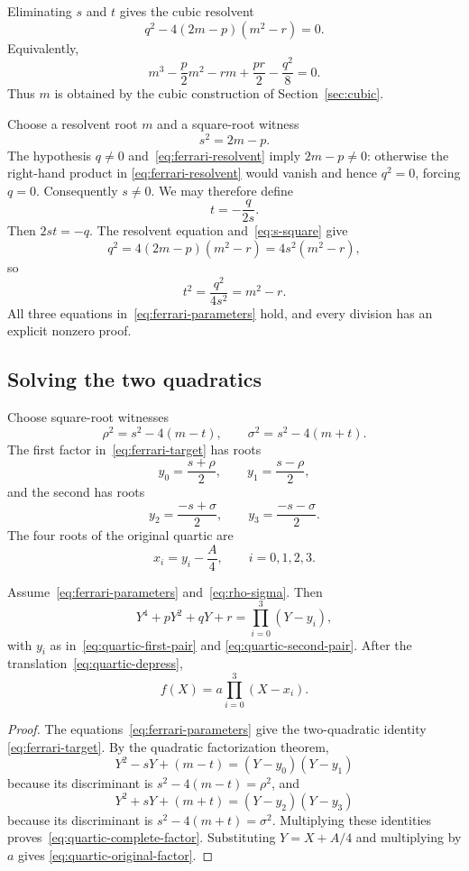 Eliminating $s$ and $t$ gives the cubic resolvent
\[
 q^2-4(2m-p)(m^2-r)=0.
 \tag{F5}\label{eq:ferrari-resolvent}
\]
Equivalently,
\[
 m^3-\frac p2m^2-rm+\frac{pr}{2}-\frac{q^2}{8}=0.
 \tag{F6}\label{eq:ferrari-resolvent-monic}
\]
Thus $m$ is obtained by the cubic construction of
Section~\ref{sec:cubic}.

Choose a resolvent root $m$ and a square-root witness
\[
 s^2=2m-p.
 \tag{F7}\label{eq:s-square}
\]
The hypothesis $q\ne0$ and~\eqref{eq:ferrari-resolvent} imply
$2m-p\ne0$: otherwise the right-hand product in
\eqref{eq:ferrari-resolvent} would vanish and hence $q^2=0$, forcing $q=0$.
Consequently $s\ne0$.  We may therefore define
\[
 t=-\frac{q}{2s}.
 \tag{F8}\label{eq:t-quotient}
\]
Then $2st=-q$.  The resolvent equation and~\eqref{eq:s-square} give
\[
 q^2=4(2m-p)(m^2-r)=4s^2(m^2-r),
\]
so
\[
 t^2=\frac{q^2}{4s^2}=m^2-r.
\]
All three equations in~\eqref{eq:ferrari-parameters} hold, and every division
has an explicit nonzero proof.

\subsection{Solving the two quadratics}

Choose square-root witnesses
\[
 \rho^2=s^2-4(m-t),
 \qquad
 \sigma^2=s^2-4(m+t).
 \tag{F9}\label{eq:rho-sigma}
\]
The first factor in~\eqref{eq:ferrari-target} has roots
\[
 y_0=\frac{s+\rho}{2},
 \qquad
 y_1=\frac{s-\rho}{2},
 \tag{F10}\label{eq:quartic-first-pair}
\]
and the second has roots
\[
 y_2=\frac{-s+\sigma}{2},
 \qquad
 y_3=\frac{-s-\sigma}{2}.
 \tag{F11}\label{eq:quartic-second-pair}
\]
The four roots of the original quartic are
\[
 x_i=y_i-\frac A4,
 \qquad i=0,1,2,3.
 \tag{F12}\label{eq:quartic-roots}
\]

\begin{theorem}
\label{thm:ferrari-factorization}
Assume~\eqref{eq:ferrari-parameters} and~\eqref{eq:rho-sigma}.  Then
\[
 Y^4+pY^2+qY+r
 =\prod_{i=0}^{3}(Y-y_i),
 \tag{F13}\label{eq:quartic-complete-factor}
\]
with $y_i$ as in~\eqref{eq:quartic-first-pair} and
\eqref{eq:quartic-second-pair}.  After the translation~\eqref{eq:quartic-depress},
\[
 f(X)=a\prod_{i=0}^{3}(X-x_i).
 \tag{F14}\label{eq:quartic-original-factor}
\]
\end{theorem}

\begin{proof}
The equations~\eqref{eq:ferrari-parameters} give the two-quadratic identity
\eqref{eq:ferrari-target}.  By the quadratic factorization theorem,
\[
 Y^2-sY+(m-t)=(Y-y_0)(Y-y_1)
\]
because its discriminant is $s^2-4(m-t)=\rho^2$, and
\[
 Y^2+sY+(m+t)=(Y-y_2)(Y-y_3)
\]
because its discriminant is $s^2-4(m+t)=\sigma^2$.  Multiplying these
identities proves~\eqref{eq:quartic-complete-factor}.  Substituting
$Y=X+A/4$ and multiplying by $a$ gives
\eqref{eq:quartic-original-factor}.
\end{proof}

